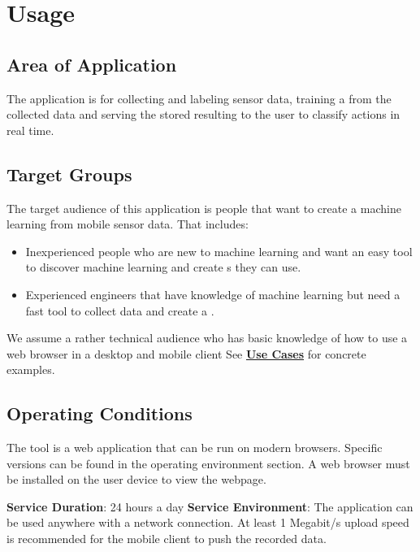 \section{Usage}
\subsection{Area of Application}
The application is for collecting and labeling \gls{sensor} data, training a  from the collected data and serving the stored resulting  to the user to classify actions in real time.

\subsection{Target Groups}
The target audience of this application is people that want to create a machine learning  from mobile \gls{sensor} data. That includes:
\begin{itemize}
    \item Inexperienced people who are new to machine learning and want an easy tool to discover machine learning and create s they can use.
    \item Experienced engineers that have knowledge of machine learning but need a fast tool to collect data and create a .
\end{itemize}
We assume a rather technical audience who has basic knowledge of how to use a web browser in a desktop and mobile client See \hyperref[Use Cases]{\textbf{Use Cases}} for concrete examples.

\subsection{Operating Conditions}
The tool is a web application that can be run on modern browsers. Specific versions can be found in the operating environment section. A web browser must be installed on the user device to view the webpage.

\textbf{Service Duration}: 24 hours a day
\newline
\newline
\textbf{Service Environment}: The application can be used anywhere with a network connection. At least 1 Megabit/s upload speed is recommended for the mobile client to push the recorded data.